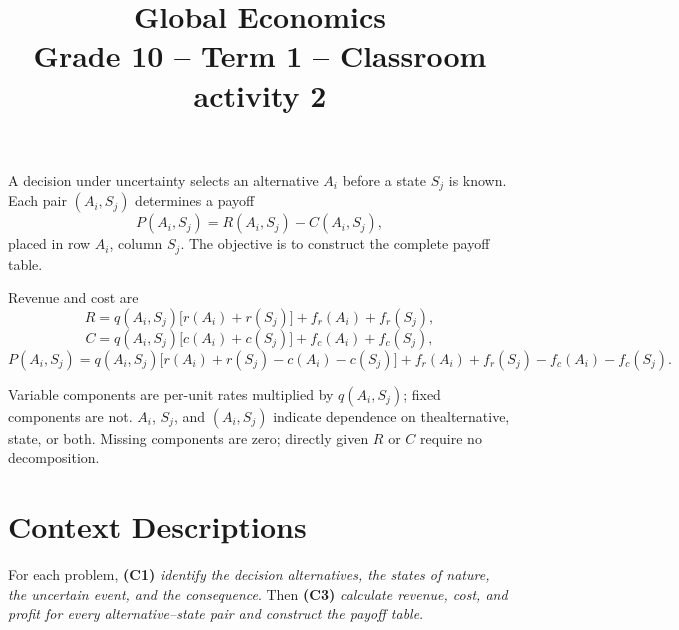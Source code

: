 \makeatletter
{}
\makeatother







\title{\vspace{-15mm} \textbf{Global Economics}\\
	Grade 10 -- Term 1 -- Classroom activity 2}
\author{}
\date{}
\pagestyle{empty}

\geometry{
	margin=0.3in,
	bottom=0.3in,
	top=0.3in
}




	\maketitle
	\vspace{-22mm}
	
	A decision under uncertainty selects an alternative \(A_i\) before a state
	\(S_j\) is known. Each pair \((A_i,S_j)\) determines a payoff
	\[
	P(A_i,S_j)=R(A_i,S_j)-C(A_i,S_j),
	\]
	placed in row \(A_i\), column \(S_j\). The objective is to construct the
	complete payoff table.
	
	Revenue and cost are
	\[
	R=q(A_i,S_j)\big[r(A_i)+r(S_j)\big]+f_r(A_i)+f_r(S_j),
	\]
	\[
	C=q(A_i,S_j)\big[c(A_i)+c(S_j)\big]+f_c(A_i)+f_c(S_j),
	\]
	\[
	P(A_i,S_j)=q(A_i,S_j)\big[r(A_i)+r(S_j)-c(A_i)-c(S_j) \big]
	+f_r(A_i)+f_r(S_j)-f_c(A_i)-f_c(S_j).
	\]
	
	Variable components are per-unit rates multiplied by \(q(A_i,S_j)\); fixed components are not. \(A_i\), \(S_j\), and \((A_i,S_j)\) indicate dependence on thealternative, state, or both. Missing components are zero; directly given
	\(R\) or \(C\) require no decomposition. \vspace{-13mm}

	\section*{Context Descriptions}
	\vspace{-3mm}

	For each problem, \textbf{(C1)} \textit{identify the decision alternatives, the states of nature, the uncertain event, and the consequence}. Then \textbf{(C3)} \textit{calculate revenue, cost, and profit for every alternative--state pair and construct the payoff table}.
	
